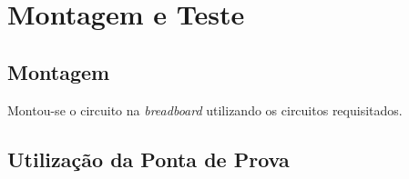 \documentclass[a4paper,12pt]{article}
\begin{document}

\section{Montagem e Teste}
\subsection{Montagem}
Montou-se o circuito na {\it breadboard} utilizando os circuitos requisitados.
\subsection{Utilização da Ponta de Prova}
\pagebreak
\end{document}
